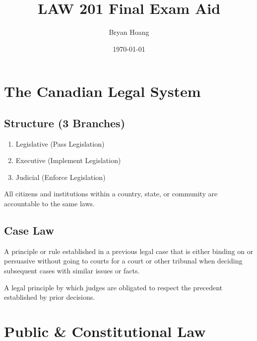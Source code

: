 \documentclass[
  letterpaper,
  landscape,
  columns=3,
  draft,
]{cheatsheet}
\title{LAW 201 Final Exam Aid}
\author{Bryan Hoang}
\date{\today}
\begin{document}
  \maketitle{}
  \section{The Canadian Legal System}
  \subsection{Structure (3 Branches)}
  \begin{enumerate}
    \item Legislative (Pass Legislation)
    \item Executive (Implement Legislation)
    \item Judicial (Enforce Legislation)
  \end{enumerate}

  \begin{definition}
    All citizens and institutions within a country, state, or community are accountable to the same laws.
  \end{definition}

  \subsection{Case Law}
  \begin{definition}[Precedent]
    A principle or rule established in a previous legal case that is either binding on or persuasive without going to courts for a court or other tribunal when deciding subsequent cases with similar issues or facts.
  \end{definition}
  \begin{definition}
    A legal principle by which judges are obligated to respect the precedent established by prior decisions.
  \end{definition}

  \section{Public \& Constitutional Law}
\end{document}
